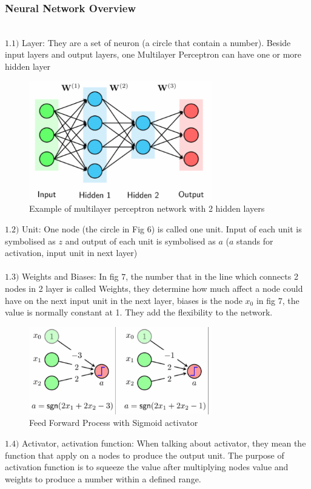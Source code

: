 \documentclass[conference]{IEEEtran}
\begin{document}
\subsubsection{Neural Network Overview}
~\\
\indent \indent
$1.1)$ Layer: They are a set of neuron (a circle that contain a number). Beside input layers and output layers, one Multilayer Perceptron can have one or more hidden layer
\begin{figure}[H]
    \centering
    \includegraphics[width=8cm]{nnmodel}
    \caption{Example of multilayer perceptron network with 2 hidden layers}
    \label{fig:fig6}
\end{figure}
\indent \indent
$1.2)$ Unit: One node (the circle in Fig $6$) is called one unit. Input of each unit is symbolised as $z$ and output of each unit is symbolised as $a$ ($a$ stands for activation, input unit  in next layer)
~\\
\\
\indent \indent
$1.3)$ Weights and Biases: In fig $7$, the number that in the line which connects 2 nodes in 2 layer is called Weights, they determine how much affect a node could have on the next input unit in the next layer, biases is the node $x_0$ in fig 7, the value is normally constant at 1. They add the flexibility to the network.
\begin{figure}[H]
    \centering
    \includegraphics[width=8cm]{feedforward}
    \caption{Feed Forward Process with Sigmoid activator}
    \label{fig:figa}
\end{figure}
\indent \indent
$1.4)$ Activator, activation function: When talking about activator, they mean the function that apply on a nodes to produce the output unit. The purpose of activation function is to squeeze the value after multiplying nodes value and weights to produce a number within a defined range.
\end{document}
